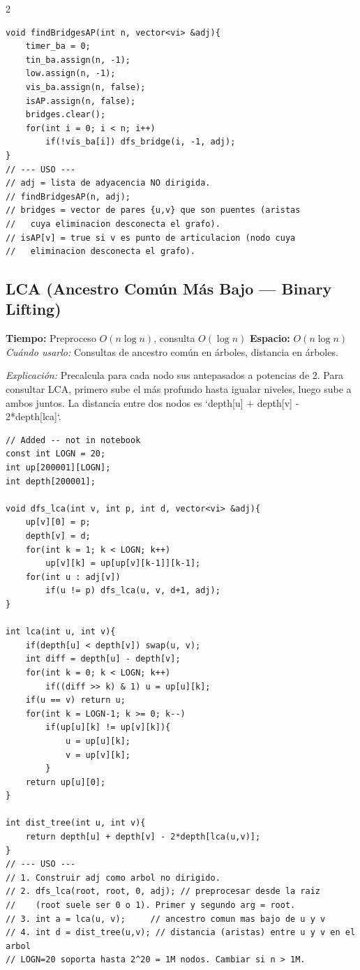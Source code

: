 \documentclass[10pt,a4paper]{article}
\begin{document}
\begin{multicols}{2}
\begin{lstlisting}
void findBridgesAP(int n, vector<vi> &adj){
    timer_ba = 0;
    tin_ba.assign(n, -1);
    low.assign(n, -1);
    vis_ba.assign(n, false);
    isAP.assign(n, false);
    bridges.clear();
    for(int i = 0; i < n; i++)
        if(!vis_ba[i]) dfs_bridge(i, -1, adj);
}
// --- USO ---
// adj = lista de adyacencia NO dirigida.
// findBridgesAP(n, adj);
// bridges = vector de pares {u,v} que son puentes (aristas
//   cuya eliminacion desconecta el grafo).
// isAP[v] = true si v es punto de articulacion (nodo cuya
//   eliminacion desconecta el grafo).
\end{lstlisting}

\subsection{LCA (Ancestro Com\'un M\'as Bajo --- Binary Lifting)}
\textbf{Tiempo:} Preproceso $O(n \log n)$, consulta $O(\log n)$ \quad \textbf{Espacio:} $O(n \log n)$\\
\textit{Cu\'ando usarlo:} Consultas de ancestro com\'un en \'arboles, distancia en \'arboles.

\textit{Explicación:} Precalcula para cada nodo sus antepasados a potencias de 2. Para consultar LCA, primero sube el más profundo hasta igualar niveles, luego sube a ambos juntos. La distancia entre dos nodos es `depth[u] + depth[v] - 2*depth[lca]`.

\begin{lstlisting}
// Added -- not in notebook
const int LOGN = 20;
int up[200001][LOGN];
int depth[200001];

void dfs_lca(int v, int p, int d, vector<vi> &adj){
    up[v][0] = p;
    depth[v] = d;
    for(int k = 1; k < LOGN; k++)
        up[v][k] = up[up[v][k-1]][k-1];
    for(int u : adj[v])
        if(u != p) dfs_lca(u, v, d+1, adj);
}

int lca(int u, int v){
    if(depth[u] < depth[v]) swap(u, v);
    int diff = depth[u] - depth[v];
    for(int k = 0; k < LOGN; k++)
        if((diff >> k) & 1) u = up[u][k];
    if(u == v) return u;
    for(int k = LOGN-1; k >= 0; k--)
        if(up[u][k] != up[v][k]){
            u = up[u][k];
            v = up[v][k];
        }
    return up[u][0];
}

int dist_tree(int u, int v){
    return depth[u] + depth[v] - 2*depth[lca(u,v)];
}
// --- USO ---
// 1. Construir adj como arbol no dirigido.
// 2. dfs_lca(root, root, 0, adj); // preprocesar desde la raiz
//    (root suele ser 0 o 1). Primer y segundo arg = root.
// 3. int a = lca(u, v);     // ancestro comun mas bajo de u y v
// 4. int d = dist_tree(u,v); // distancia (aristas) entre u y v en el arbol
// LOGN=20 soporta hasta 2^20 = 1M nodos. Cambiar si n > 1M.
\end{lstlisting}




\end{multicols}
\end{document}
